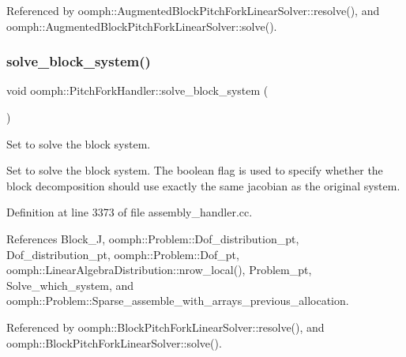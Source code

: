 Referenced by oomph\+::\+Augmented\+Block\+Pitch\+Fork\+Linear\+Solver\+::resolve(), and oomph\+::\+Augmented\+Block\+Pitch\+Fork\+Linear\+Solver\+::solve().

\mbox{\label{classoomph_1_1PitchForkHandler_ad193c3d67741edd60b023c94e42c8802}} 
\subsubsection{\texorpdfstring{solve\+\_\+block\+\_\+system()}{solve\_block\_system()}}
{\footnotesize\ttfamily void oomph\+::\+Pitch\+Fork\+Handler\+::solve\+\_\+block\+\_\+system (\begin{DoxyParamCaption}{ }\end{DoxyParamCaption})}



Set to solve the block system. 

Set to solve the block system. The boolean flag is used to specify whether the block decomposition should use exactly the same jacobian as the original system. 

Definition at line 3373 of file assembly\+\_\+handler.\+cc.



References Block\+\_\+J, oomph\+::\+Problem\+::\+Dof\+\_\+distribution\+\_\+pt, Dof\+\_\+distribution\+\_\+pt, oomph\+::\+Problem\+::\+Dof\+\_\+pt, oomph\+::\+Linear\+Algebra\+Distribution\+::nrow\+\_\+local(), Problem\+\_\+pt, Solve\+\_\+which\+\_\+system, and oomph\+::\+Problem\+::\+Sparse\+\_\+assemble\+\_\+with\+\_\+arrays\+\_\+previous\+\_\+allocation.



Referenced by oomph\+::\+Block\+Pitch\+Fork\+Linear\+Solver\+::resolve(), and oomph\+::\+Block\+Pitch\+Fork\+Linear\+Solver\+::solve().

\mbox{\label{classoomph_1_1PitchForkHandler_a27325616f4342d159f6f5e7c82ccdf98}} 
